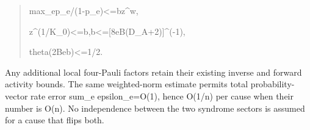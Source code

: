 \documentclass[
]{article}
\begin{document}
\begin{quote}\small\ttfamily\raggedright\setlength{\parskip}{0pt}
\noindent m\allowbreak{}a\allowbreak{}x\allowbreak{}\_\allowbreak{}e\allowbreak{}\hspace*{0.525em}\allowbreak{}p\allowbreak{}\_\allowbreak{}e\allowbreak{}/\allowbreak{}(\allowbreak{}1\allowbreak{}-\allowbreak{}p\allowbreak{}\_\allowbreak{}e\allowbreak{})\allowbreak{}\hspace*{0.525em}\allowbreak{}<\allowbreak{}=\allowbreak{}\hspace*{0.525em}\allowbreak{}b\allowbreak{}\hspace*{0.525em}\allowbreak{}z\allowbreak{}\^{}\allowbreak{}w\allowbreak{},\par
\noindent z\allowbreak{}\^{}\allowbreak{}(\allowbreak{}1\allowbreak{}/\allowbreak{}K\allowbreak{}\_\allowbreak{}0\allowbreak{})\allowbreak{}\hspace*{0.525em}\allowbreak{}<\allowbreak{}=\allowbreak{}\hspace*{0.525em}\allowbreak{}b\allowbreak{},\allowbreak{}\hspace*{0.525em}\allowbreak{}\hspace*{0.525em}\allowbreak{}b\allowbreak{}\hspace*{0.525em}\allowbreak{}<\allowbreak{}=\allowbreak{}\hspace*{0.525em}\allowbreak{}[\allowbreak{}8\allowbreak{}e\allowbreak{}B\allowbreak{}(\allowbreak{}D\allowbreak{}\_\allowbreak{}A\allowbreak{}+\allowbreak{}2\allowbreak{})\allowbreak{}]\allowbreak{}\^{}\allowbreak{}(\allowbreak{}-\allowbreak{}1\allowbreak{})\allowbreak{},\par
\noindent t\allowbreak{}h\allowbreak{}e\allowbreak{}t\allowbreak{}a\allowbreak{}(\allowbreak{}2\allowbreak{}B\allowbreak{}e\allowbreak{}\hspace*{0.525em}\allowbreak{}b\allowbreak{})\allowbreak{}\hspace*{0.525em}\allowbreak{}<\allowbreak{}=\allowbreak{}\hspace*{0.525em}\allowbreak{}1\allowbreak{}/\allowbreak{}2\allowbreak{}.\par
\end{quote}

Any additional local four-Pauli factors retain their existing inverse
and forward activity bounds. The same weighted-norm estimate permits
total probability-vector rate error sum\_e
e\allowbreak{}p\allowbreak{}s\allowbreak{}i\allowbreak{}l\allowbreak{}o\allowbreak{}n\allowbreak{}\_\allowbreak{}e\allowbreak{}=\allowbreak{}O\allowbreak{}(\allowbreak{}1\allowbreak{})\allowbreak{},
hence O(1/n) per cause when their number is O(n). No independence
between the two syndrome sectors is assumed for a cause that flips both.
\end{document}

